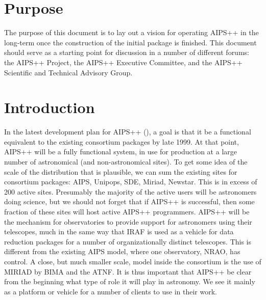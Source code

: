 \newcommand{\specsURL}{../../specs/specs.html}
\newcommand{\consortiumURL}{../consortium.html}
%
%

%


\section{Purpose}

The purpose of this document is to lay out a vision for operating
AIPS++ in the long-term once the construction of the initial
package is finished. This document should serve as a starting
point for discussion in a number of different forums: the AIPS++
Project, the AIPS++ Executive Committee, and the AIPS++ Scientific
and Technical Advisory Group.

\section{Introduction}

In the latest development plan for AIPS++ (), a goal is
that it be a functional equivalent to the existing consortium packages
by late 1999. At that point, AIPS++ will be a fully functional system,
in use for production at a large number of astronomical (and
non-astronomical sites). To get some idea of the scale of the
distribution that is plausible, we can sum the existing sites for
consortium packages: AIPS, Unipops, SDE, Miriad, Newstar. This is in
excess of 200 active sites. Presumably the majority of the active
users will be astronomers doing science, but we should not forget that
if AIPS++ is successful, then some fraction of these sites will host
active AIPS++ programmers. AIPS++ will be the mechanism for
observatories to provide support for astronomers using their
telescopes, much in the same way that IRAF is used as a vehicle for
data reduction packages for a number of organizationally distinct
telescopes. This is different from the existing AIPS model, where one
observatory, NRAO, has control. A close, but much smaller scale, model
inside the consortium is the use of MIRIAD by BIMA and the ATNF.  It
is thus important that AIPS++ be clear from the beginning what type of
role it will play in astronomy. We see it mainly as a platform or
vehicle for a number of clients to use in their work.

